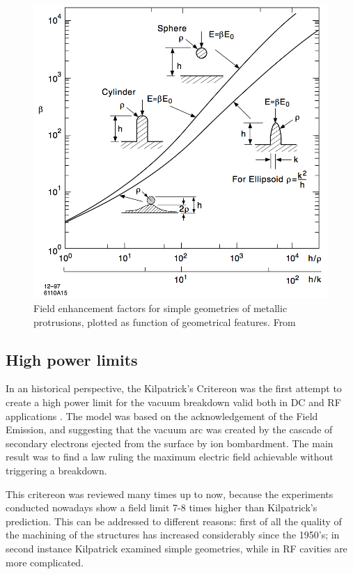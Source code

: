 \begin{figure}[h]
\centering

\includegraphics[scale=0.3]{pictures/beta_tip_val}
\caption{Field enhancement factors for simple geometries of metallic protrusions, plotted as function of geometrical features. From \cite{Rohrbach:190223}}
\label{tip_factors}

\end{figure}





\subsection[High power limits]{High power limits}

In an historical perspective, the Kilpatrick's Critereon was the first attempt to create a high power limit for the vacuum breakdown valid both in DC and RF applications \cite{KilpLimit}. The model was based on the acknowledgement of the Field Emission, and suggesting that the vacuum arc was created by the cascade of secondary electrons ejected from the surface by ion bombardment. The main result was to find a law ruling the maximum electric field achievable without triggering a breakdown. 

This critereon was reviewed many times up to now, because the experiments conducted nowadays show a field limit 7-8 times higher than Kilpatrick's prediction. This can be addressed to different reasons: first of all the quality of the machining of the structures has increased considerably since the 1950's; in second instance Kilpatrick examined simple geometries, while in RF cavities are more complicated.

